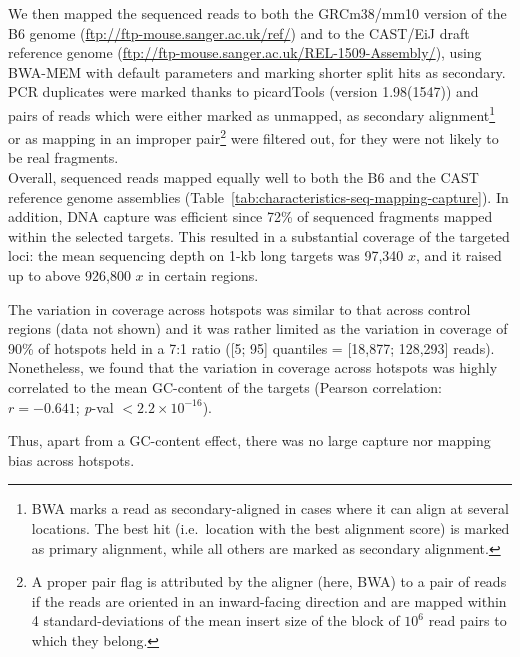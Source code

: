 We then mapped the sequenced reads to both the GRCm38/mm10 version of the B6 genome (\url{ftp://ftp-mouse.sanger.ac.uk/ref/}) and to the CAST/EiJ draft reference genome (\url{ftp://ftp-mouse.sanger.ac.uk/REL-1509-Assembly/}), using BWA-MEM \citep{li2009fast, li2013aligning} with default parameters and marking shorter split hits as secondary.
PCR duplicates were marked thanks to picardTools (version 1.98(1547)) \citep{picard2018toolkit} and pairs of reads which were either marked as unmapped, as secondary alignment\footnote{BWA marks a read as secondary-aligned in cases where it can align at several locations. The best hit (i.e.\ location with the best alignment score) is marked as primary alignment, while all others are marked as secondary alignment.} or as mapping in an improper pair\footnote{A proper pair flag is attributed by the aligner (here, BWA) to a pair of reads if the reads are oriented in an inward-facing direction and are mapped within 4 standard-deviations of the mean insert size of the block of $10^6$ read pairs to which they belong.} were filtered out, for they were not likely to be real fragments.\\

Overall, sequenced reads mapped equally well to both the B6 and the CAST reference genome assemblies (Table~\ref{tab:characteristics-seq-mapping-capture}).
In addition, DNA capture was efficient since 72\% of sequenced fragments mapped within the selected targets.
This resulted in a substantial coverage of the targeted loci: the mean sequencing depth on 1-kb long targets was 97,340 $x$, and it raised up to above 926,800 $x$ in certain regions.

The variation in coverage across hotspots was similar to that across control regions (data not shown) and it was rather limited as the variation in coverage of 90\% of hotspots held in a 7:1 ratio ([5; 95] quantiles = [18,877; 128,293] reads).
Nonetheless, we found that the variation in coverage across hotspots was highly correlated to the mean GC-content of the targets (Pearson correlation: ${r = -0.641}$; \textit{p}-val $< 2.2 \times 10^{-16}$).

Thus, apart from a GC-content effect, there was no large capture nor mapping bias across hotspots.


